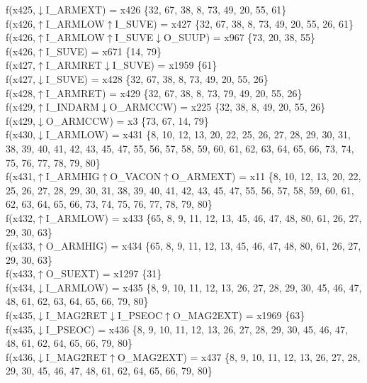 f(x425,$\downarrow$I\_ARMEXT) = x426 \{32, 67, 38, 8, 73, 49, 20, 55, 61\} \\  
f(x426,$\uparrow$I\_ARMLOW$\uparrow$I\_SUVE) = x427 \{32, 67, 38, 8, 73, 49, 20, 55, 26, 61\} \\  
f(x426,$\uparrow$I\_ARMLOW$\uparrow$I\_SUVE$\downarrow$O\_SUUP) = x967 \{73, 20, 38, 55\} \\  
f(x426,$\uparrow$I\_SUVE) = x671 \{14, 79\} \\  
f(x427,$\uparrow$I\_ARMRET$\downarrow$I\_SUVE) = x1959 \{61\} \\  
f(x427,$\downarrow$I\_SUVE) = x428 \{32, 67, 38, 8, 73, 49, 20, 55, 26\} \\  
f(x428,$\uparrow$I\_ARMRET) = x429 \{32, 67, 38, 8, 73, 79, 49, 20, 55, 26\} \\  
f(x429,$\uparrow$I\_INDARM$\downarrow$O\_ARMCCW) = x225 \{32, 38, 8, 49, 20, 55, 26\} \\  
f(x429,$\downarrow$O\_ARMCCW) = x3 \{73, 67, 14, 79\} \\  
f(x430,$\downarrow$I\_ARMLOW) = x431 \{8, 10, 12, 13, 20, 22, 25, 26, 27, 28, 29, 30, 31, 38, 39, 40, 41, 42, 43, 45, 47, 55, 56, 57, 58, 59, 60, 61, 62, 63, 64, 65, 66, 73, 74, 75, 76, 77, 78, 79, 80\} \\  
f(x431,$\uparrow$I\_ARMHIG$\uparrow$O\_VACON$\uparrow$O\_ARMEXT) = x11 \{8, 10, 12, 13, 20, 22, 25, 26, 27, 28, 29, 30, 31, 38, 39, 40, 41, 42, 43, 45, 47, 55, 56, 57, 58, 59, 60, 61, 62, 63, 64, 65, 66, 73, 74, 75, 76, 77, 78, 79, 80\} \\  
f(x432,$\uparrow$I\_ARMLOW) = x433 \{65, 8, 9, 11, 12, 13, 45, 46, 47, 48, 80, 61, 26, 27, 29, 30, 63\} \\  
f(x433,$\uparrow$O\_ARMHIG) = x434 \{65, 8, 9, 11, 12, 13, 45, 46, 47, 48, 80, 61, 26, 27, 29, 30, 63\} \\  
f(x433,$\uparrow$O\_SUEXT) = x1297 \{31\} \\  
f(x434,$\downarrow$I\_ARMLOW) = x435 \{8, 9, 10, 11, 12, 13, 26, 27, 28, 29, 30, 45, 46, 47, 48, 61, 62, 63, 64, 65, 66, 79, 80\} \\  
f(x435,$\downarrow$I\_MAG2RET$\downarrow$I\_PSEOC$\uparrow$O\_MAG2EXT) = x1969 \{63\} \\  
f(x435,$\downarrow$I\_PSEOC) = x436 \{8, 9, 10, 11, 12, 13, 26, 27, 28, 29, 30, 45, 46, 47, 48, 61, 62, 64, 65, 66, 79, 80\} \\  
f(x436,$\downarrow$I\_MAG2RET$\uparrow$O\_MAG2EXT) = x437 \{8, 9, 10, 11, 12, 13, 26, 27, 28, 29, 30, 45, 46, 47, 48, 61, 62, 64, 65, 66, 79, 80\} \\  
